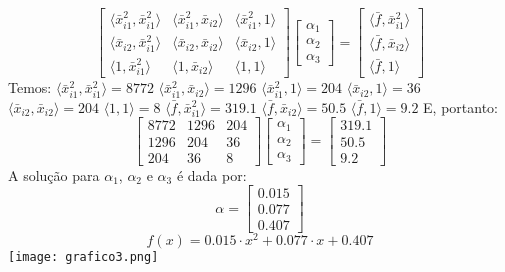\documentclass{article}
\begin{document}
\[
\begin{bmatrix}
\langle \bar{x}_{i1}^2, \bar{x}_{i1}^2 \rangle & \langle \bar{x}_{i1}^2, \bar{x}_{i2} \rangle & \langle \bar{x}_{i1}^2, 1 \rangle \\
\langle \bar{x}_{i2}, \bar{x}_{i1}^2 \rangle & \langle \bar{x}_{i2}, \bar{x}_{i2} \rangle & \langle \bar{x}_{i2}, 1 \rangle \\
\langle 1, \bar{x}_{i1}^2 \rangle & \langle 1, \bar{x}_{i2} \rangle & \langle 1, 1 \rangle 
\end{bmatrix}
\begin{bmatrix}
\alpha_1 \\ 
\alpha_2 \\ 
\alpha_3 
\end{bmatrix}
=
\begin{bmatrix}
\langle \bar{f}, \bar{x}_{i1}^2 \rangle \\ 
\langle \bar{f}, \bar{x}_{i2} \rangle \\ 
\langle \bar{f}, 1 \rangle 
\end{bmatrix}
\]
Temos:\hfill\break\hfill\break
$\langle \bar{x}_{i1}^2, \bar{x}_{i1}^2 \rangle = 8772$\hfill\break
$\langle \bar{x}_{i1}^2, \bar{x}_{i2} \rangle = 1296$\hfill\break
$\langle \bar{x}_{i1}^2, 1 \rangle = 204$\hfill\break
$\langle \bar{x}_{i2}, 1 \rangle = 36$\hfill\break
$\langle \bar{x}_{i2}, \bar{x}_{i2} \rangle = 204$\hfill\break
$\langle 1, 1 \rangle = 8$\hfill\break
$\langle \bar{f}, \bar{x}_{i1}^2 \rangle = 319.1$\hfill\break
$\langle \bar{f}, \bar{x}_{i2} \rangle = 50.5$\hfill\break
$\langle \bar{f}, 1 \rangle = 9.2$\hfill\break
\hfill\break
E, portanto:
\hfill\break
\[
\begin{bmatrix}
8772 & 1296 & 204 \\
1296 & 204 & 36 \\
204 & 36 & 8 
\end{bmatrix}
\begin{bmatrix}
\alpha_1 \\ 
\alpha_2 \\ 
\alpha_3 
\end{bmatrix}
=
\begin{bmatrix}
319.1 \\ 
50.5 \\ 
9.2 
\end{bmatrix}
\]
\hfill\break\hfill\break
A solução para \(\alpha_1\), \(\alpha_2\) e \(\alpha_3\) é dada por:
\[
\alpha =
\begin{bmatrix}
0.015 \\
0.077 \\
0.407 
\end{bmatrix}
\]
\[
f(x) = 0.015 \cdot x^2 + 0.077 \cdot x + 0.407
\]
\texttt{[image: grafico3.png]}
\end{document}
